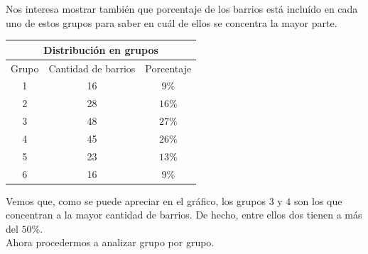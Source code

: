 \documentclass[a4paper, 10pt]{article}
\newcommand\tab[1][0.5cm]{\hspace*{#1}}
\begin{document}
			  	\tab Nos interesa mostrar también que porcentaje de los barrios está incluído en cada uno de estos grupos para
			  	saber en cuál de ellos se concentra la mayor parte.
			  	\begin{center}
			  		\begin{tabular}{ |c|c|c| }
						\hline
						\multicolumn{3}{|c|}{Distribución en grupos} \\
						\hline
						\hline
						Grupo & Cantidad de barrios & Porcentaje \\
						\hline
						1 & 16 & $9\%$ \\
						\hline
						2 & 28 & $16\%$ \\
						\hline
						3 & 48 & $27\%$ \\
						\hline
						4 & 45 & $26\%$ \\
						\hline
						5 & 23 & $13\%$ \\
						\hline						
						6 & 16 & $9\%$ \\
						\hline						
			  		\end{tabular}
				\end{center}			  	 
				\tab Vemos que, como se puede apreciar en el gráfico, los grupos $3$ y $4$ son los que concentran a la mayor
				cantidad de barrios. De hecho, entre ellos dos tienen a más del $50\%$. \\
				\tab Ahora procedermos a analizar grupo por grupo.
\end{document}
